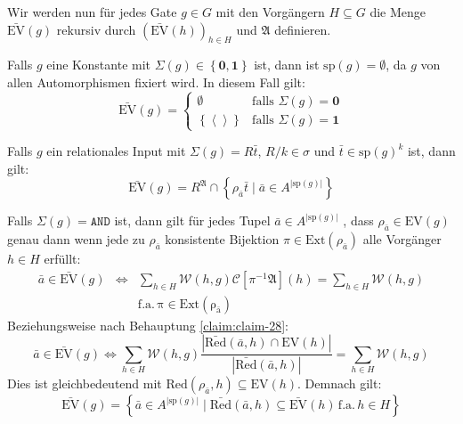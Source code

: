 Wir werden nun für jedes Gate $g\in G$ mit den Vorgängern $H\subseteq G$
die Menge $\bar{\mathrm{EV}}\left(g\right)$ rekursiv durch $\left(\bar{\mathrm{EV}}\left(h\right)\right)_{h\in H}$
und $\mathfrak{A}$ definieren.
\begin{casenv}
\item Falls $g$ eine Konstante mit $\Sigma\left(g\right)\in\left\{ \mathbf{0},\mathbf{1}\right\} $
ist, dann ist $\mathrm{sp}\left(g\right)=\emptyset$, da $g$ von
allen Automorphismen fixiert wird. In diesem Fall gilt:
\[
\bar{\mathrm{EV}}\left(g\right)=\begin{cases}
\emptyset & \mathrm{falls}\,\,\Sigma\left(g\right)=\mathbf{0}\\
\left\{ \left\langle \right\rangle \right\}  & \mathrm{falls}\,\,\Sigma\left(g\right)=\mathbf{1}
\end{cases}
\]
\item Falls $g$ ein relationales Input mit $\Sigma\left(g\right)=R\bar{t}$,
$R/k\in\sigma$ und $\bar{t}\in\mathrm{sp}\left(g\right)^{k}$ ist,
dann gilt:
\[
\bar{\mathrm{EV}}\left(g\right)=R^{\mathfrak{A}}\cap\left\{ \rho_{\bar{a}}\bar{t}\mid\bar{a}\in A^{\left|\mathrm{sp}\left(g\right)\right|}\right\} 
\]
\item Falls $\Sigma\left(g\right)=\mathtt{AND}$ ist, dann gilt für jedes
Tupel $\bar{a}\in A^{\left|\mathrm{sp}\left(g\right)\right|}$ , dass
$\rho_{\bar{a}}\in\mathrm{EV}\left(g\right)$ genau dann wenn jede
zu $\rho_{\bar{a}}$ konsistente Bijektion $\pi\in\mathrm{Ext}\left(\rho_{\bar{a}}\right)$
alle Vorgänger $h\in H$ erfüllt: 
\begin{eqnarray*}
\bar{a}\in\bar{\mathrm{EV}}\left(g\right) & \Leftrightarrow & \sum_{h\in H}\mathcal{W}\left(h,g\right)\mathcal{C}\left[\pi^{-1}\mathfrak{A}\right]\left(h\right)=\sum_{h\in H}\mathcal{W}\left(h,g\right)\\
 &  & \mathrm{f.a.\,\pi\in\mathrm{Ext}\left(\rho_{\bar{a}}\right)}
\end{eqnarray*}
Beziehungsweise nach Behauptung \ref{claim:claim-28}:
\[
\bar{a}\in\bar{\mathrm{EV}}\left(g\right)\Leftrightarrow\sum_{h\in H}\mathcal{W}\left(h,g\right)\frac{\left|\bar{\mathrm{Red}}\left(\bar{a},h\right)\cap\mathrm{EV}\left(h\right)\right|}{\left|\bar{\mathrm{Red}}\left(\bar{a},h\right)\right|}=\sum_{h\in H}\mathcal{W}\left(h,g\right)
\]
Dies ist gleichbedeutend mit $\mathrm{Red}\left(\rho_{\bar{a}},h\right)\subseteq\mathrm{EV}\left(h\right)$.
Demnach gilt:
\[
\bar{\mathrm{EV}}\left(g\right)=\left\{ \bar{a}\in A^{\left|\mathrm{sp}\left(g\right)\right|}\mid\bar{\mathrm{Red}}\left(\bar{a},h\right)\subseteq\bar{\mathrm{EV}}\left(h\right)\,\mathrm{f.a.}\,h\in H\right\} 
\]
\end{casenv}
